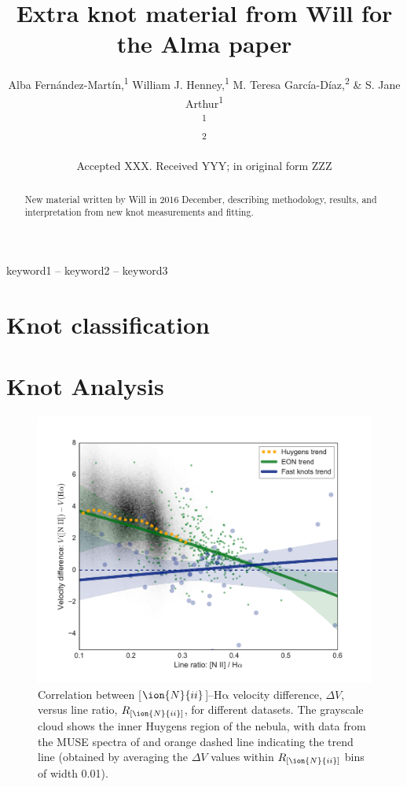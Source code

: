 \documentclass[usenatbib]{mnras}
\title[Will's extra material]{Extra knot material from Will for the
  Alma paper}
\author[Fernández-Martín et al.]{
  Alba Fernández-Martín,\textsuperscript{1}
  William J. Henney,\textsuperscript{1}
  M. Teresa García-Díaz,\textsuperscript{2}
  \& S. Jane Arthur\textsuperscript{1}\\
  \textsuperscript{1}\AddressIRyA\\
  \textsuperscript{2}\AddressEnsenada\\
}
\date{Accepted XXX. Received YYY; in original form ZZZ}
\begin{document}
\label{firstpage}
\pagerange{\pageref{firstpage}--\pageref{lastpage}}
\maketitle

\begin{abstract}
New material written by Will in 2016 December, describing methodology,
results, and interpretation from new knot measurements and fitting.
\end{abstract}

\begin{keywords}
keyword1 -- keyword2 -- keyword3
\end{keywords}

\newcommand\nii{\ensuremath{\ion{N}{ii}}}
\newcommand\ha{\ensuremath{\mathrm{H\alpha}}}

\section{Knot classification}
\label{sec:knot-classification}

\section{Knot Analysis}
\label{sec:knot-analysis}

\begin{figure}
  \centering
  \includegraphics[width=\linewidth]{knot-dv-versus-nii-ha-ratio}
  \caption{Correlation between [\nii]--\ha{} velocity difference,
    \(\Delta V\), versus line ratio, \(R_{[\nii]}\), for different
    datasets. The grayscale cloud shows the inner Huygens region of
    the nebula, with data from the MUSE spectra of \citet{MUSE} and
    orange dashed line indicating the trend line (obtained by
    averaging the \(\Delta V\) values within \(R_{[\nii]}\) bins of
    width 0.01).  }
\end{figure}
\end{document}
